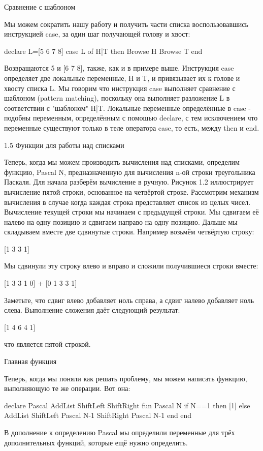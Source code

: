 Сравнение с шаблоном

Мы можем сократить нашу работу и получить части списка воспользовавшись инструкцией case, за один шаг получающей голову и хвост:

declare
L=[5 6 7 8]
case L of H|T then {Browse H} {Browse T} end

Возвращаются 5 и [6 7 8], также, как и в примере выше. Инструкция case определяет две локальные переменные, H и T, и привязывает их к голове и хвосту списка L. Мы говорим что инструкция case выполняет сравнение с шаблоном (pattern matching), поскольку она выполняет разложение L в соответствии с "шаблоном" H|T. Локальные переменные определённые в case - подобны переменным, определённым с помощью declare, с тем исключением что переменные существуют только в теле оператора case, то есть, между then и end.

1.5 Функции для работы над списками

Теперь, когда мы можем производить вычисления над списками, определим функцию, {Pascal N}, предназначенную для вычисления n-ой строки треугольника Паскаля. Для начала разберём вычисление в ручную. Рисунок 1.2 иллюстрирует вычисление пятой строки, основанное на четвёртой строке. Рассмотрим механизм вычисления в случае когда каждая строка представляет список из целых чисел. Вычисление текущей строки мы начинаем с предыдущей строки. Мы сдвигаем её налево на одну позицию и сдвигаем направо на одну позицию. Дальше мы складываем вместе две сдвинутые строки. Например возьмём четвёртую строку:

[1 3 3 1]

Мы сдвинули эту строку влево и вправо и сложили получившиеся строки вместе:

[1 3 3 1 0]
+ [0 1 3 3 1]

Заметьте, что сдвиг влево добавляет ноль справа, а сдвиг налево добавляет ноль слева. Выполнение сложения даёт следующий результат:

[1 4 6 4 1]

что является пятой строкой.

Главная функция

Теперь, когда мы поняли как решать проблему, мы можем написать функцию, выполняющую те же операции. Вот она:

declare Pascal AddList ShiftLeft ShiftRight
fun {Pascal N}
if N==1 then [1]
else
{AddList {ShiftLeft {Pascal N-1}}
{ShiftRight {Pascal N-1}}}
end
end

В дополнение к определению Pascal мы определили переменные для трёх дополнительных функций, которые ещё нужно определить.

